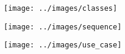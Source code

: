 
\begin{center}
    \texttt{[image: ../images/classes]}
    \vspace{1in}

    \texttt{[image: ../images/sequence]}
    \vspace{1in}

    \texttt{[image: ../images/use\_case]}
\end{center}
